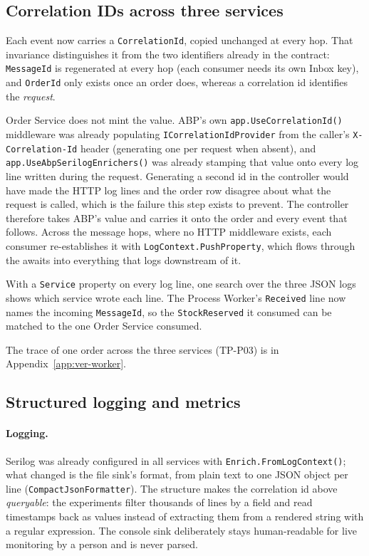 \documentclass[a4paper]{report}
\begin{document}
\subsection{Correlation IDs across three services}

Each event now carries a \texttt{CorrelationId}, copied unchanged at every
hop. That invariance distinguishes it from the two identifiers already in the
contract: \texttt{MessageId} is regenerated at every hop (each consumer needs
its own Inbox key), and \texttt{OrderId} only exists once an order does,
whereas a correlation id identifies the \emph{request}.

\sloppy Order Service does not mint the value. ABP's own
\texttt{app.UseCorrelationId()} middleware was already populating
\texttt{ICorrelation\allowbreak IdProvider} from the caller's \texttt{X-Correlation-Id}
header (generating one per request when absent), and
\texttt{app.UseAbp}\allowbreak\texttt{SerilogEnrichers()} was already stamping that value onto
every log line written during the request. Generating a second id in the
controller would have made the HTTP log lines and the order row disagree
about what the request is called, which is the failure this step exists to
prevent. The controller therefore takes ABP's value and carries it onto the
order and every event that follows. Across the message hops, where no HTTP
middleware exists, each consumer re-establishes it with
\texttt{LogContext.\allowbreak PushProperty}, which flows through the awaits into
everything that logs downstream of it.\par

With a \texttt{Service} property on every log line, one search over the three
JSON logs shows which service wrote each line. The Process Worker's
\texttt{Received} line now names the incoming \texttt{MessageId}, so the
\texttt{StockReserved} it consumed can be matched to the one Order Service
consumed.

The trace of one order across the three services (TP-P03) is in Appendix~\ref{app:ver-worker}.

\subsection{Structured logging and metrics}

\paragraph{Logging.} Serilog was already configured in all services with
\texttt{Enrich.}\allowbreak\texttt{FromLog\allowbreak Context()}; what changed is the file sink's format,
from plain text to one JSON object per line
(\texttt{Compact\allowbreak Json\allowbreak Formatter}). The structure makes the correlation id
above \emph{queryable}: the experiments filter thousands of lines by a field
and read timestamps back as values instead of extracting them from a rendered
string with a regular expression. The console sink deliberately stays
human-readable for live monitoring by a person and is never parsed.
\end{document}
